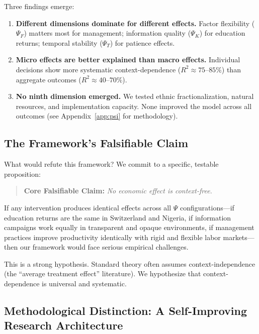 Three findings emerge:
\begin{enumerate}
    \item \textbf{Different dimensions dominate for different effects.} Factor flexibility ($\Psi_F$) matters most for management; information quality ($\Psi_K$) for education returns; temporal stability ($\Psi_T$) for patience effects.
    
    \item \textbf{Micro effects are better explained than macro effects.} Individual decisions show more systematic context-dependence ($R^2 \approx 75$--$85\%$) than aggregate outcomes ($R^2 \approx 40$--$70\%$).
    
    \item \textbf{No ninth dimension emerged.} We tested ethnic fractionalization, natural resources, and implementation capacity. None improved the model across all outcomes (see Appendix~\ref{app:psi} for methodology).
\end{enumerate}

\subsection{The Framework's Falsifiable Claim}
\label{sec:intro-falsifiable}

What would refute this framework? We commit to a specific, testable proposition:

\begin{quote}
\textbf{Core Falsifiable Claim:} \emph{No economic effect is context-free.}
\end{quote}

If any intervention produces identical effects across all $\Psi$ configurations---if education returns are the same in Switzerland and Nigeria, if information campaigns work equally in transparent and opaque environments, if management practices improve productivity identically with rigid and flexible labor markets---then our framework would face serious empirical challenges.

This is a strong hypothesis. Standard theory often assumes context-independence (the ``average treatment effect'' literature). We hypothesize that context-dependence is universal and systematic.

\subsection{Methodological Distinction: A Self-Improving Research Architecture}
\label{sec:intro-methodology}

